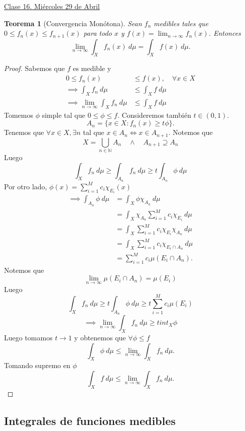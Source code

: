 \documentclass{article}
\newtheorem{theorem}{Teorema}[subsection]
\theoremstyle{definition}
\theoremstyle{remark}
\numberwithin{equation}{section}
\newcommand{\N}{\mathbb{N}}
\newcommand{\oo}{\infty}
\newcommand{\ds}{\displaystyle}
\newcommand{\fecha}[1]{\begin{flushright} \underline{#1} \end{flushright}}
\begin{document}
\fecha{Clase 16. Miércoles 29 de Abril}
\begin{theorem}
  [Convergencia Monótona]
  Sean $f_n$ medibles tales que $0 \leq f_n(x) \leq f_{n+1}(x)$ para todo $x$ y $\ds f(x) = \lim_{n\to\oo} f_n(x)$. Entonces 
  \[ \lim_{n\to\oo} \int_X f_n(x) \ d\mu = \int_X f(x) \ d\mu. \]
\end{theorem}
\begin{proof}
  Sabemos que $f$ es medible y 
  \begin{align*}
      0 \leq f_n(x) &\leq f(x), \quad \forall x \in X \\
      \implies \int_X f_n \ d\mu &\leq \int_X f \ d\mu \\
      \implies \lim_{n\to\oo} \int_X f_n \ d\mu &\leq \int_X f \ d\mu
  \end{align*}
  Tomemos $\phi$ simple tal que $0 \leq \phi \leq f$. Consideremos también $t \in (0,1)$. 
  \[ A_n = \{x \in X \colon f_n(x) \geq t \phi\}. \]
  Tenemos que $\forall x \in X, \exists n$ tal que $x \in A_n \iff x \in A_{n+1}$. Notemos que 
  \[ X = \bigcup_{n\in\N} A_n \quad\land\quad A_{n+1} \supseteq A_n \]
  Luego 
  \[ \int_X f_n \ d\mu \geq \int_{A_n} f_n \ d\mu \geq t \int_{A_n} \phi \ d\mu \]
  Por otro lado, $\ds \phi(x) = \sum_{i=1}^M c_i \chi_{E_i}(x)$ 
  \begin{align*}
      \implies \int_{A_n} \phi \ d\mu &= \int_X \phi \chi_{A_n} \ d\mu \\
      &= \int_X \chi_{A_n} \sum_{i=1}^M c_i \chi_{E_i} \ d\mu \\
      &= \int_X \sum_{i=1}^M c_i \chi_{E_i}\chi_{A_n} \ d\mu \\
      &= \int_X \sum_{i=1}^M c_i \chi_{E_i \cap A_n} \ d\mu \\
      &= \sum_{i=1}^M c_i \mu(E_i \cap A_n).
  \end{align*}
  Notemos que
  \[ \lim_{n\to\oo} \mu(E_i \cap A_n) = \mu(E_i) \] %
  Luego 
  \[ \int_X f_n \ d\mu \geq t \int_{A_n} \phi \ d\mu \geq t \sum_{i=1}^M c_i \mu(E_i) \] 
  \[ \implies \lim_{n \to \oo} \int_X f_n \ d\mu \geq t int_X \phi \]
  Luego tomamos $t \to 1$ y obtenemos que $\forall \phi \leq f$
  \[ \int_X \phi \ d\mu \leq \lim_{n\to\oo} \int_X f_n \ d\mu. \]
  Tomando supremo en $\phi$ 
  \[ \int_X f \ d\mu \leq \lim_{n\to\oo} \int_X f_n \ d\mu. \]
\end{proof}

\newpage
\subsection{Integrales de funciones medibles}
\end{document}
